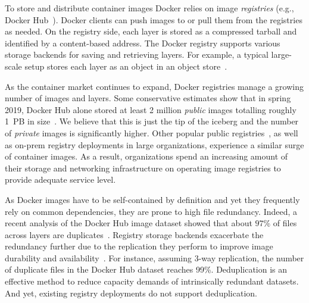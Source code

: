 To store and distribute container images Docker relies on image
\emph{registries} (e.g., Docker Hub~\cite{docker-hub}).
%
Docker clients can push images to or pull them from the registries as needed.
%
On the registry side, each layer is stored as a compressed tarball and
identified by a content-based address.
%
The Docker registry supports various storage backends for saving and retrieving
layers. For example, a typical large-scale setup stores each layer as an object in an
object store~\cite{s3,swift}.

As the container market continues to expand, Docker registries manage a
growing number of images and layers.
%
Some conservative estimates show that in spring 2019, Docker Hub alone
stored at least 2 million \emph{public} images totalling roughly 1~PB in
size~\cite{skourtis2019carving,dedupanalysis}. 
%
We believe that this is just the tip of the iceberg and the number of
\emph{private} images is significantly higher.
%
Other popular public
registries~\cite{amazon-ecr,jfrog-artifactory,azure-cr,google-cr}, as well as
on-prem registry deployments in large organizations, experience a similar
surge of container images.
%
As a result,
organizations spend an increasing amount of their storage and networking
infrastructure on operating image registries to provide adequate service level.

%

As Docker images have to be self-contained by definition
and yet they frequently rely on common dependencies,
they are prone to high file redundancy.
%
%
Indeed, a recent analysis of the
Docker Hub image dataset showed that about $97$\% of files across layers are
duplicates~\cite{dedupanalysis}.
%
%
Registry storage backends exacerbate the redundancy further due to the
replication they perform to improve image durability and
availability~\cite{Bonvin:2010:SFS:1807128.1807162}.
%
For instance, assuming 3-way replication, the number of duplicate files in the
Docker Hub dataset reaches 99\%.
%
Deduplication is an effective method to reduce capacity demands of intrinsically redundant
datasets.
%
And yet, existing registry deployments do not support deduplication.

